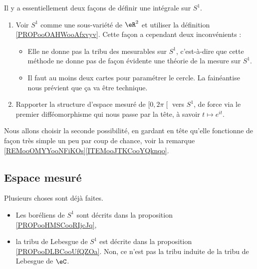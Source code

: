 Il y a essentiellement deux façons de définir une intégrale sur \( S^1\).
\begin{enumerate}
    \item Voir \( S^1\) comme une sous-variété de \( \eR^2\) et utiliser la définition \ref{PROPooOAHWooAfxvyv}. Cette façon a cependant deux inconvénients :
        \begin{itemize}
            \item Elle ne donne pas la tribu des mesurables sur \( S^1\), c'est-à-dire que cette méthode ne donne pas de façon évidente une théorie de la mesure sur \( S^1\).
            \item Il faut au moins deux cartes pour paramétrer le cercle. La fainéantise nous prévient que ça va être technique.
        \end{itemize}
    \item
        Rapporter la structure d'espace mesuré de \( \mathopen[ 0 , 2\pi \mathclose[\) vers \( S^1\), de force via le premier difféomorphisme qui nous passe par la tête, à savoir \( t\mapsto  e^{it}\).
\end{enumerate}
Nous allons choisir la seconde possibilité, en gardant en tête qu'elle fonctionne de façon très simple un peu par coup de chance, voir la remarque \ref{REMooOMYYooNFiKOs}\ref{ITEMooJTKCooYQknqo}.

\subsection{Espace mesuré}

Plusieurs choses sont déjà faites.
\begin{itemize}
    \item Les boréliens de \( S^1\) sont décrits dans la proposition \ref{PROPooHMSCooRIjcJq},
    \item la tribu de Lebesgue de \( S^1\) est décrite dans la proposition \ref{PROPooDLBCooUfQZOa}. Non, ce n'est pas la tribu induite de la tribu de Lebesgue de \( \eC\).
\end{itemize}

